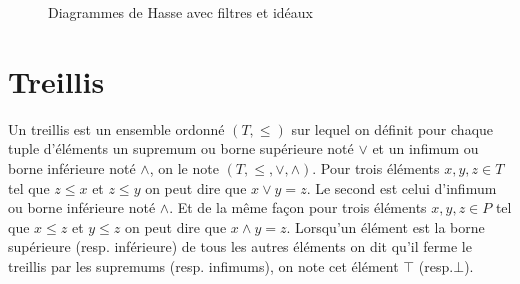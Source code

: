 \begin{figure}[H]
	\begin{minipage}{0.3\textwidth}
	\begin{center}
	\end{center}
	\end{minipage}
	\begin{minipage}{0.3\textwidth}
	\begin{center}
	\end{center}
	\end{minipage}
	\begin{minipage}{0.3\textwidth}
	\begin{center}
	\end{center}
	\end{minipage}
	\caption{Diagrammes de Hasse avec filtres et idéaux}
	\label{hasse_filtres_ideaux}
\end{figure}

\section{Treillis}

Un treillis est un ensemble ordonné $(T, \leq)$ sur lequel on définit pour chaque tuple d'éléments un supremum ou borne supérieure noté $\vee$ et un infimum ou borne inférieure noté $\wedge$, on le note $(T, \leq, \vee, \wedge)$. Pour trois éléments $x, y, z \in T$ tel que $z \leq x$ et $z \leq y$ on peut dire que $x \vee y = z$. Le second est celui d'infimum ou borne inférieure noté $\wedge$. Et de la même façon pour trois éléments $x, y, z \in P$ tel que $x \leq z$ et $y \leq z$ on peut dire que $x \wedge y = z$. Lorsqu'un élément est la borne supérieure (resp. inférieure) de tous les autres éléments on dit qu'il ferme le treillis par les supremums (resp. infimums), on note cet élément $\top$ (resp.$\bot$).

